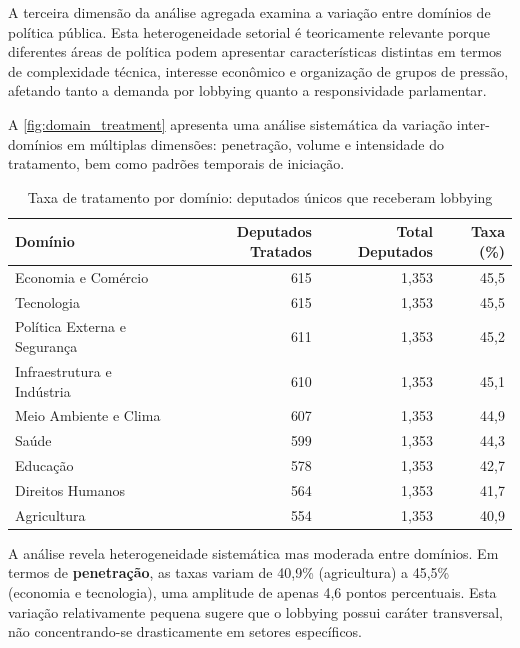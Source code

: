 A terceira dimensão da análise agregada examina a variação entre domínios de política pública. Esta heterogeneidade setorial é teoricamente relevante porque diferentes áreas de política podem apresentar características distintas em termos de complexidade técnica, interesse econômico e organização de grupos de pressão, afetando tanto a demanda por lobbying quanto a responsividade parlamentar.


A \autoref{fig:domain_treatment} apresenta uma análise sistemática da variação inter-domínios em múltiplas dimensões: penetração, volume e intensidade do tratamento, bem como padrões temporais de iniciação.


\begin{table}[htbp]
    \centering
    \caption{Taxa de tratamento por domínio: deputados únicos que receberam lobbying}
    \label{tab:domain_treatment_rates}
    \begin{tabular}{lrrr}
    \toprule
    \textbf{Domínio} & \textbf{Deputados Tratados} & \textbf{Total Deputados} & \textbf{Taxa (\%)} \\
    \midrule
    Economia e Comércio & 615 & 1{,}353 & 45{,}5 \\
    Tecnologia & 615 & 1{,}353 & 45{,}5 \\
    Política Externa e Segurança & 611 & 1{,}353 & 45{,}2 \\
    Infraestrutura e Indústria & 610 & 1{,}353 & 45{,}1 \\
    Meio Ambiente e Clima & 607 & 1{,}353 & 44{,}9 \\
    Saúde & 599 & 1{,}353 & 44{,}3 \\
    Educação & 578 & 1{,}353 & 42{,}7 \\
    Direitos Humanos & 564 & 1{,}353 & 41{,}7 \\
    Agricultura & 554 & 1{,}353 & 40{,}9 \\
    \bottomrule
    \end{tabular}
    \end{table}

A análise revela heterogeneidade sistemática mas moderada entre domínios. Em termos de \textbf{penetração}, as taxas variam de 40,9\% (agricultura) a 45,5\% (economia e tecnologia), uma amplitude de apenas 4,6 pontos percentuais. Esta variação relativamente pequena sugere que o lobbying possui caráter transversal, não concentrando-se drasticamente em setores específicos.

